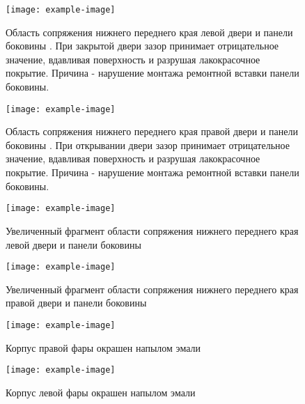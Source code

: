 {   
   
   
   
   \begin{figure}[H]\centering
   	\parbox[t]{0.49\textwidth}
   	{\centering
   		\texttt{[image: example-image]}
   		\caption{\footnotesize {Область сопряжения нижнего переднего края левой двери и панели боковины . При закрытой двери зазор принимает отрицательное значение, вдавливая поверхность и разрушая лакокрасочное покрытие. Причина - нарушение монтажа ремонтной вставки панели боковины.}}
   		\label{ris:images/b3}}
   	\hfil \hfil
   	\parbox[t]{0.49\textwidth}
   	{\centering
   		\texttt{[image: example-image]}
   		\caption{\footnotesize {Область сопряжения нижнего переднего края правой двери и панели боковины . При открывании двери зазор принимает отрицательное значение, вдавливая поверхность и разрушая лакокрасочное покрытие. Причина - нарушение монтажа ремонтной вставки панели боковины.}}
   		\label{ris:images/b4}}
   \end{figure}

%
\begin{figure}[H]\centering
	\parbox[t]{0.49\textwidth}
	{\centering
		\texttt{[image: example-image]}
		\caption{\footnotesize {Увеличенный фрагмент области сопряжения нижнего переднего края левой двери и панели боковины }}
		\label{крайдвери}}
	\hfil \hfil
	\parbox[t]{0.49\textwidth}
	{\centering
		\texttt{[image: example-image]}
		\caption{\footnotesize {Увеличенный фрагмент области сопряжения нижнего переднего края правой двери и панели боковины \тс}}
		\label{дп}}
\end{figure}
%
   
   \begin{figure}[H]\centering
   	\parbox[t]{0.49\textwidth}
   	{\centering
   		\texttt{[image: example-image]}
   		\caption{\footnotesize {Корпус правой фары окрашен напылом эмали}}
   		\label{фараправая}}
   	\hfil \hfil
   	\parbox[t]{0.49\textwidth}
   	{\centering
   		\texttt{[image: example-image]}
   		\caption{\footnotesize {Корпус левой фары окрашен напылом  эмали}}
   		\label{фаралевая}}
   \end{figure}



}
